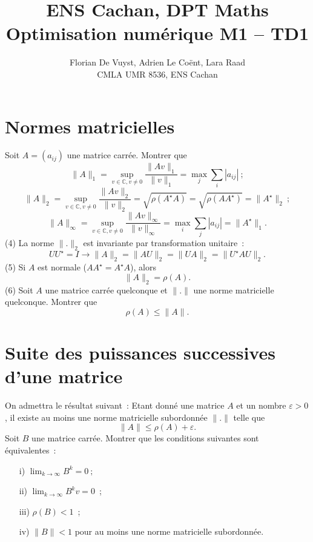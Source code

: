 \documentclass[11pt, a4paper]{article}
\title{ENS Cachan, DPT Maths \\ [1cm]
Optimisation numérique M1 -- TD1}
\author{Florian De Vuyst, Adrien Le Coënt, Lara Raad \\ CMLA UMR 8536, ENS Cachan}
\newcommand{\Mq}{Montrer que }
\newcommand{\be}{\begin{equation}}
\newcommand{\ee}{\end{equation}}
\begin{document}
%
\maketitle
%
\section{Normes matricielles}
%
Soit $A=(a_{ij})$ une matrice carrée. \Mq
\be
\|A\|_1 = \sup_{v\in\mathbb{C},v\neq 0} \dfrac{\|Av\|_1}{\|v\|_1}
= \max_j \sum_i |a_{ij}|~;
\ee
%
\be
\|A\|_2 =  \sup_{v\in\mathbb{C},v\neq 0} \dfrac{\|Av\|_2}{\|v\|_2}
 = \sqrt{\rho(A^\star A)} = \sqrt{\rho(AA^\star)}=\|A^\star\|_2~;
\ee
\be
\|A\|_\infty = \sup_{v\in\mathbb{C},v\neq 0} \dfrac{\|Av\|_\infty}{\|v\|_\infty}
= \max_i \sum_j |a_{ij}|=\|A^\star\|_1.
\ee
(4) La norme $\|.\|_2$ est invariante par transformation unitaire~:
\[
UU^\star = I \rightarrow \|A\|_2=\|A U\|_2=\|U A\|_2=\|U^\star A U\|_2.
\]
(5) Si $A$ est normale ($AA^\star=A^\star A$), alors
\[
\|A\|_2 = \rho(A).
\]
(6) Soit $A$ une matrice carrée quelconque et $\|.\|$ une norme matricielle
quelconque. Montrer que
\[
\rho(A) \leq \|A\|.
\]
\medskip
\section{Suite des puissances successives d'une matrice}
%
On admettra le résultat suivant~: Etant donné une matrice $A$
et un nombre $\varepsilon>0$, il existe au moins une norme matricielle
subordonnée $\|.\|$ telle que
\[
\|A\| \leq \rho(A) + \varepsilon.
\]
Soit $B$ une matrice carrée. Montrer que les conditions suivantes sont équivalentes~:
\begin{itemize}
\item [i)] $\lim_{k\rightarrow \infty} B^k = 0~;$

\item [ii)] $\lim_{k\rightarrow \infty} B^k v=0$~;

\item [iii)] $\rho(B)<1$~;

\item [iv)] $\|B\|<1$ pour au moins une norme matricielle subordonnée.
\end{itemize}
%
\medskip
\end{document}
